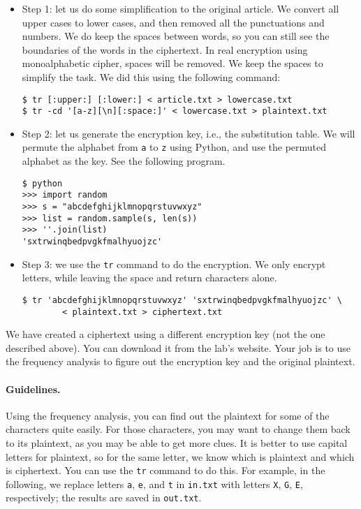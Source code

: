 \begin{itemize}

\item Step 1: let us do some simplification to the original article. 
We convert all upper cases to lower cases, and then
removed all the punctuations and numbers.  We do keep the spaces between words, so
you can still see the boundaries of the words in the ciphertext. 
In real encryption using monoalphabetic cipher,
spaces will be removed. We keep the spaces to simplify the task. We did this using the 
following command:

\begin{lstlisting}
$ tr [:upper:] [:lower:] < article.txt > lowercase.txt
$ tr -cd '[a-z][\n][:space:]' < lowercase.txt > plaintext.txt
\end{lstlisting}


\item Step 2: let us generate the encryption key, i.e., the substitution table.
We will permute the alphabet from \texttt{a}
to \texttt{z} using Python, and use the permuted alphabet as the key. See the following program.   

\begin{lstlisting}
$ python
>>> import random
>>> s = "abcdefghijklmnopqrstuvwxyz"
>>> list = random.sample(s, len(s))
>>> ''.join(list)
'sxtrwinqbedpvgkfmalhyuojzc'
\end{lstlisting}
 

\item Step 3: we use the \texttt{tr} command to do the encryption. 
We only encrypt letters, while leaving the space and return characters alone. 


\begin{lstlisting}
$ tr 'abcdefghijklmnopqrstuvwxyz' 'sxtrwinqbedpvgkfmalhyuojzc' \
        < plaintext.txt > ciphertext.txt
\end{lstlisting}

\end{itemize}


We have created a ciphertext using a different encryption key (not the one described above).
You can download it from the lab's website. Your job is to use the frequency analysis 
to figure out the encryption key and the original plaintext.  



\paragraph{Guidelines.} Using the frequency analysis, you can find 
out the plaintext for some of the characters quite easily. For those characters, you may want
to change them back to its plaintext, as you may be able to get more clues. 
It is better to use capital letters for plaintext, so for the same letter, we 
know which is plaintext and which is ciphertext. 
You can use the \texttt{tr} command to do this. For example, in the following,
we replace letters \texttt{a}, \texttt{e}, and \texttt{t} in
\texttt{in.txt} with letters \texttt{X}, \texttt{G}, \texttt{E}, respectively;
the results are saved in \texttt{out.txt}. 


